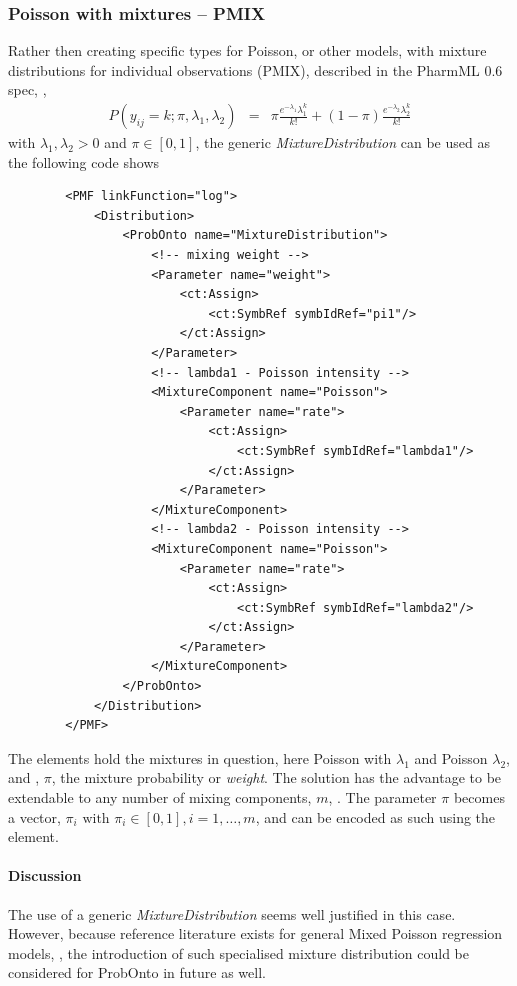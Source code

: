 {\subsubsection{Poisson with mixtures -- PMIX}
Rather then creating specific types for Poisson, or other models, with mixture distributions for 
individual observations (PMIX), described in the PharmML 0.6 spec, \cite{Pharmml_06},
\begin{eqnarray}
P(y_{ij} = k;\pi,\lambda_1,\lambda_2) &=& \pi \frac{e^{-\lambda_1} \lambda_1^k}{k!} + (1-\pi) \frac{e^{-\lambda_2} \lambda_2^k}{k!} \nonumber
\end{eqnarray}
with $\lambda_1, \lambda_2 > 0$ and $\pi \in [0,1]$, the generic \emph{MixtureDistribution} 
can be used as the following code shows
\lstset{language=XML}
\begin{lstlisting}
        <PMF linkFunction="log">
            <Distribution>
                <ProbOnto name="MixtureDistribution">
                    <!-- mixing weight -->
                    <Parameter name="weight">
                        <ct:Assign>
                            <ct:SymbRef symbIdRef="pi1"/>
                        </ct:Assign>
                    </Parameter>
                    <!-- lambda1 - Poisson intensity -->
                    <MixtureComponent name="Poisson">
                        <Parameter name="rate">
                            <ct:Assign>
                                <ct:SymbRef symbIdRef="lambda1"/>
                            </ct:Assign>
                        </Parameter>
                    </MixtureComponent>
                    <!-- lambda2 - Poisson intensity -->
                    <MixtureComponent name="Poisson">
                        <Parameter name="rate">
                            <ct:Assign>
                                <ct:SymbRef symbIdRef="lambda2"/>
                            </ct:Assign>
                        </Parameter>
                    </MixtureComponent>
                </ProbOnto>
            </Distribution>
        </PMF>
\end{lstlisting}
The  elements hold the mixtures in question, here
Poisson with $\lambda_1$ and Poisson $\lambda_2$, and 
, $\pi$, the mixture probability or \emph{weight}. The solution has the advantage 
to be extendable to any number of mixing components, $m$, \cite{Forbes:2010jk}. 
The parameter $\pi$ becomes a vector, $\pi_i \text{ with } \pi_i \in [0,1], i=1,\dots,m$, 
and can be encoded as such using the  element.
\paragraph{Discussion}
The use of a generic \emph{MixtureDistribution} seems well justified in this case. 
However, because reference literature exists for general Mixed Poisson regression models, 
\cite{Wang:1996fj}, the introduction of such specialised mixture distribution 
could be considered for ProbOnto in future as well.



}
